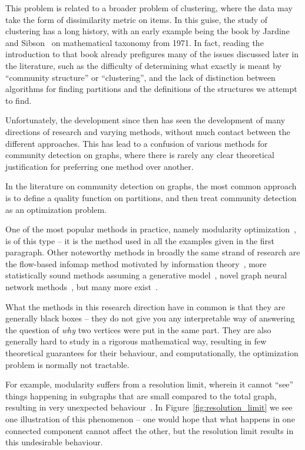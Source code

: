 \documentclass[a4paper,reqno,oneside]{article} %
\begin{document}
This problem is related to a broader problem of clustering, where the data may take the form of dissimilarity metric on items. In this guise, the study of clustering has a long history, with an early example being the book by Jardine and Sibson~\cite{Jardine_Sibson_1971} on mathematical taxonomy from 1971. In fact, reading the introduction to that book already prefigures many of the issues discussed later in the literature, such as the difficulty of determining what exactly is meant by ``community structure'' or ``clustering'', and the lack of distinction between algorithms for finding partitions and the definitions of the structures we attempt to find.

Unfortunately, the development since then has seen the development of many directions of research and varying methods, without much contact between the different approaches. This has lead to a confusion of various methods for community detection on graphs, where there is rarely any clear theoretical justification for preferring one method over another.

In the literature on community detection on graphs, the most common approach is to define a quality function on partitions, and then treat community detection as an optimization problem.

One of the most popular methods in practice, namely modularity optimization~\cite{NewmanGirvan}, is of this type -- it is the method used in all the examples given in the first paragraph. Other noteworthy methods in broadly the same strand of research are the flow-based infomap method motivated by information theory~\cite{infomap}, more statistically sound methods assuming a generative model~\cite{Peixoto_clustering_method}, novel graph neural network methods~\cite{node2vec_clustering}, but many more exist~\cite{multidisciplinary_review_methods}.

What the methods in this research direction have in common is that they are generally black boxes  -- they do not give you any interpretable way of answering the question of \emph{why} two vertices were put in the same part. They are also generally hard to study in a rigorous mathematical way, resulting in few theoretical guarantees for their behaviour, and computationally, the optimization problem is normally not tractable.

For example, modularity suffers from a resolution limit, wherein it cannot ``see'' things happening in subgraphs that are small compared to the total graph, resulting in very unexpected behaviour~\cite{resolution_limit}. In Figure~\ref{fig:resolution_limit} we see one illustration of this phenomenon -- one would hope that what happens in one connected component cannot affect the other, but the resolution limit results in this undesirable behaviour.
\end{document}
